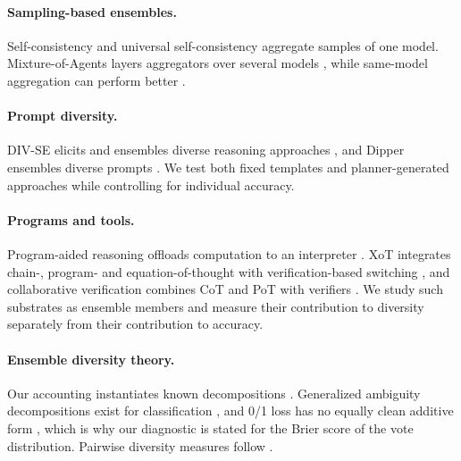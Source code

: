 \documentclass[11pt]{article}
\begin{document}
\paragraph{Sampling-based ensembles.} Self-consistency \citep{wang2023selfconsistency} and
universal self-consistency \citep{chen2023universal} aggregate samples of one model.
Mixture-of-Agents layers aggregators over several models \citep{wang2024moa}, while same-model
aggregation can perform better \citep{li2025rethinking}.
\paragraph{Prompt diversity.} DIV-SE elicits and ensembles diverse reasoning approaches
\citep{naik2023diversity}, and Dipper ensembles diverse prompts \citep{dipper2024}. We test both
fixed templates and planner-generated approaches while controlling for individual accuracy.
\paragraph{Programs and tools.} Program-aided reasoning offloads computation to an interpreter
\citep{gao2023pal,chen2022program}. XoT integrates chain-, program- and equation-of-thought with
verification-based switching \citep{liu2023plan}, and collaborative verification combines CoT and
PoT with verifiers \citep{liang2024improving}. We study such substrates as ensemble members and
measure their contribution to diversity separately from their contribution to accuracy.
\paragraph{Ensemble diversity theory.} Our accounting instantiates known decompositions
\citep{krogh1995neural,wood2023unified}. Generalized ambiguity decompositions exist for
classification \citep{jiang2017generalized}, and 0/1 loss has no equally clean additive form
\citep{wood2023unified}, which is why our diagnostic is stated for the Brier score of the vote
distribution. Pairwise diversity measures follow \citet{kuncheva2003measures}.
\end{document}
